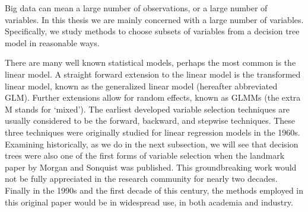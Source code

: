  Big data can mean a large number of observations, or a large number of variables. In this thesis we are mainly concerned with a large number of variables. Specifically, we study methods to choose subsets of variables from a decision tree model in reasonable ways. 


There are many well known statistical models, perhaps the most common is the linear model. A straight forward extension to the linear model is the transformed linear model, known as the generalized linear model (hereafter abbreviated GLM).  Further extensions allow for random effects, known as GLMMs (the extra M stands for `mixed'). The earliest developed variable selection techniques are usually considered to be the forward, backward, and stepwise techniques. These three techniques were originally studied for linear regression models in the 1960s. Examining historically, as we do in the next subsection, we will see that decision trees were also one of the first forms of variable selection when the landmark paper by Morgan and Sonquist \cite{morgan1963problems} was published. This groundbreaking work would not be fully appreciated in the research community for nearly two decades. Finally in the 1990s and the first decade of this century, the methods employed in this original paper would be in widespread use, in both academia and industry. 



